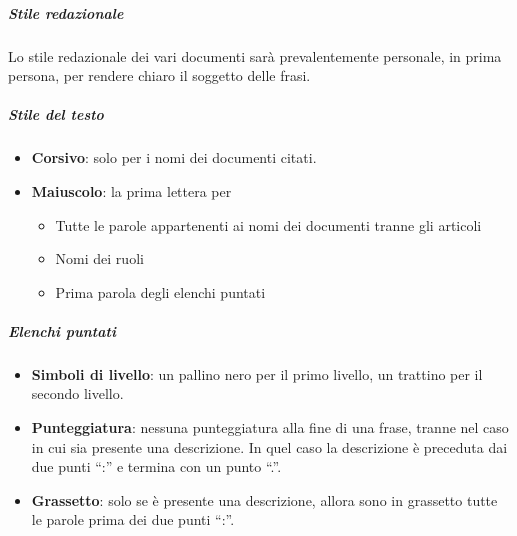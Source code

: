 			\subparagraph{Stile redazionale}
			Lo stile redazionale dei vari documenti sarà prevalentemente personale, in prima persona, per rendere chiaro il soggetto delle frasi.

			\subparagraph{Stile del testo}\label{PS:Documentazione:Design:NormeT:StileTesto}
			\begin{itemize}
				\item \textbf{Corsivo}: solo per i nomi dei documenti citati.
				\item \textbf{Maiuscolo}: la prima lettera per
				\begin{itemize}
					\item Tutte le parole appartenenti ai nomi dei documenti tranne gli articoli
					\item Nomi dei ruoli
					\item Prima parola degli elenchi puntati
				\end{itemize}
			\end{itemize}

			\subparagraph{Elenchi puntati}\label{PS:Documentazione:Design:NormeT:ElenchiPuntati}
			\begin{itemize}
				\item \textbf{Simboli di livello}: un pallino nero per il primo livello, un trattino per il secondo livello.
				\item \textbf{Punteggiatura}: nessuna punteggiatura alla fine di una frase, tranne nel caso in cui sia presente una descrizione.
					In quel caso la descrizione è preceduta dai due punti ``:'' e termina con un punto ``.''.
				\item \textbf{Grassetto}: solo se è presente una descrizione, allora sono in grassetto tutte le parole prima dei due punti ``:''.
			\end{itemize}

